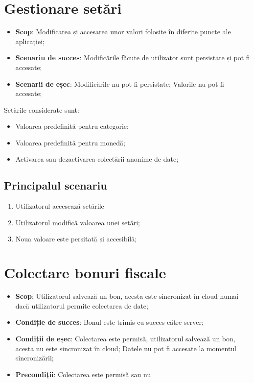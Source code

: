 \section{Gestionare setări}\label{gestionare-setux103ri}

\begin{itemize}
\item
  \textbf{Scop}: Modificarea și accesarea unor valori folosite în diferite puncte ale aplicației;
\item
  \textbf{Scenariu de succes}: Modificările făcute de utilizator sunt persistate și pot fi accesate;
\item
  \textbf{Scenarii de eșec}: Modificările nu pot fi persistate; Valorile nu pot fi accesate;
\end{itemize}

Setările considerate sunt:

\begin{itemize}
\item
  Valoarea predefinită pentru categorie;
\item
  Valoarea predefinită pentru monedă;
\item
  Activarea sau dezactivarea colectării anonime de date;
\end{itemize}

\subsection{Principalul scenariu}\label{principalul-scenariu-2}

\begin{enumerate}
\item
  Utilizatorul accesează setările
\item
  Utilizatorul modifică valoarea unei setări;
\item
  Noua valoare este persitată și accesibilă;
\end{enumerate}

\section{Colectare bonuri fiscale}\label{colectare-bonuri-fiscale}

\begin{itemize}
\item
  \textbf{Scop}: Utilizatorul salvează un bon, acesta este sincronizat în cloud numai dacă utilizatorul permite colectarea de date;
\item
  \textbf{Condiție de succes}: Bonul este trimis cu succes către server;
\item
  \textbf{Condiții de eșec}: Colectarea este permisă, utilizatorul salvează un bon, acesta nu este sincronizat în cloud; Datele nu pot fi accesate la momentul sincronizării;
\item
  \textbf{Precondiții}: Colectarea este permisă sau nu
\end{itemize}

